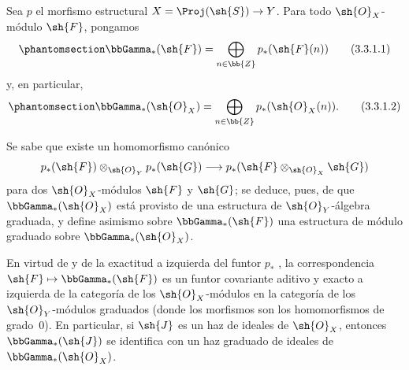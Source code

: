 \documentclass[oneside,10pt]{amsart}
\makeatletter
\newcommand{\ega@arrow}[2]{\mathchoice{#1}{#2}{#2}{#2}}
\let\ega@shortmapsto\mapsto
\renewcommand{\to}{\ega@arrow{\longrightarrow}{\rightarrow}}
\renewcommand{\mapsto}{\ega@arrow{\longmapsto}{\ega@shortmapsto}}
\newcommand{\oldpage}[2][]{\marginnote{\normalfont\footnotesize\textbf{#1}~|~#2}\ignorespaces}
\let\EGAOriginalLabel\label
\renewcommand{\label}[1]{\phantomsection\EGAOriginalLabel{#1}}
\makeatother
\begin{document}
\begin{env}[3.3.1]
\label{II.3.3.1}
Sea $p$ el morfismo estructural $X=\Proj(\sh{S})\to Y$.
Para todo $\sh{O}_X$-módulo $\sh{F}$, pongamos
\[
\label{II.3.3.1.1}
  \bbGamma_*(\sh{F})=\bigoplus_{n\in\bb{Z}}p_*(\sh{F}(n))
\tag{3.3.1.1}
\]
\oldpage[II]{57}
y, en particular,
\[
\label{II.3.3.1.2}
  \bbGamma_*(\sh{O}_X)=\bigoplus_{n\in\bb{Z}}p_*(\sh{O}_X(n)).
\tag{3.3.1.2}
\]

Se sabe  que existe un homomorfismo canónico
\[
  p_*(\sh{F})\otimes_{\sh{O}_Y}p_*(\sh{G})
  \to p_*(\sh{F}\otimes_{\sh{O}_X}\sh{G})
\]
para dos $\sh{O}_X$-módulos $\sh{F}$ y $\sh{G}$; se deduce, pues, de  que $\bbGamma_*(\sh{O}_X)$ está provisto de una estructura de $\sh{O}_Y$-álgebra graduada, y  define asimismo sobre $\bbGamma_*(\sh{F})$ una estructura de módulo graduado sobre $\bbGamma_*(\sh{O}_X)$.

En virtud de  y de la exactitud a izquierda del funtor $p_*$ , la correspondencia $\sh{F}\mapsto\bbGamma_*(\sh{F})$ es un funtor covariante aditivo y exacto a izquierda de la categoría de los $\sh{O}_X$-módulos en la categoría de los $\sh{O}_Y$-módulos graduados (donde los morfismos son los homomorfismos de grado~$0$).
En particular, si $\sh{J}$ es un haz de ideales de $\sh{O}_X$, entonces $\bbGamma_*(\sh{J})$ se identifica con un haz graduado de ideales de $\bbGamma_*(\sh{O}_X)$.
\end{env}
\end{document}

